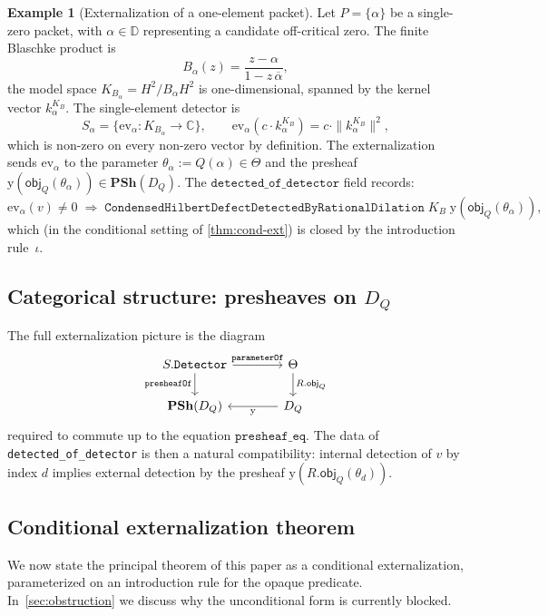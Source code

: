 \documentclass[12pt]{article}
\theoremstyle{plain}
\theoremstyle{definition}
\newtheorem{example}[theorem]{Example}
\theoremstyle{remark}
\newcommand{\KB}{K_{B}}
\newcommand{\HardyTwo}{H^{2}}
\newcommand{\Disk}{\mathbb{D}}
\newcommand{\Complex}{\mathbb{C}}
\newcommand{\Yon}{\mathrm{y}}
\newcommand{\PSh}{\mathbf{PSh}}
\newcommand{\DQ}{D_{Q}}
\newcommand{\objQ}{\mathsf{obj}_{Q}}
\begin{document}
\begin{example}[Externalization of a one-element packet]
\label{ex:one-packet}
Let $P = \{\alpha\}$ be a single-zero packet, with $\alpha\in\Disk$
representing a candidate off-critical zero.  The finite Blaschke
product is
\[
  B_\alpha(z) = \frac{z - \alpha}{1 - z\,\overline{\alpha}},
\]
the model space $K_{B_\alpha} = \HardyTwo / B_\alpha\HardyTwo$ is
one-dimensional, spanned by the kernel vector $k_\alpha^{\KB}$.
The single-element detector is
\[
  S_\alpha = \{\mathrm{ev}_\alpha\colon K_{B_\alpha}\to\Complex\},
  \qquad \mathrm{ev}_\alpha(c\cdot k_\alpha^{\KB})
  = c\cdot \|k_\alpha^{\KB}\|^2,
\]
which is non-zero on every non-zero vector by definition.  The
externalization sends $\mathrm{ev}_\alpha$ to the parameter
$\theta_\alpha := Q(\alpha)\in\Theta$ and the presheaf
$\Yon(\objQ(\theta_\alpha))\in\PSh(\DQ)$.  The
$\texttt{detected\_of\_detector}$ field records:
\[
  \mathrm{ev}_\alpha(v)\neq 0
  \;\Longrightarrow\;
  \texttt{CondensedHilbertDefectDetectedByRationalDilation}\;
  \KB\;\Yon(\objQ(\theta_\alpha)),
\]
which (in the conditional setting of \cref{thm:cond-ext}) is closed
by the introduction rule~$\iota$.
\end{example}

\subsection{Categorical structure: presheaves on $\DQ$}

The full externalization picture is the diagram
\[
\begin{tikzcd}[column sep=large]
  S.\texttt{Detector} \arrow[r, "\texttt{parameterOf}"]
    \arrow[d, swap, "\texttt{presheafOf}"]
  & \Theta \arrow[d, "R.\objQ"] \\
  \PSh(\DQ) & \DQ \arrow[l, "\Yon"]
\end{tikzcd}
\]
required to commute up to the equation $\texttt{presheaf\_eq}$.  The
data of \texttt{detected\_of\_detector} is then a natural compatibility:
internal detection of $v$ by index $d$ implies external detection by
the presheaf $\Yon(R.\objQ(\theta_d))$.

\subsection{Conditional externalization theorem}

We now state the principal theorem of this paper as a conditional
externalization, parameterized on an introduction rule for the opaque
predicate.  In~\cref{sec:obstruction} we discuss why the unconditional
form is currently blocked.
\end{document}
